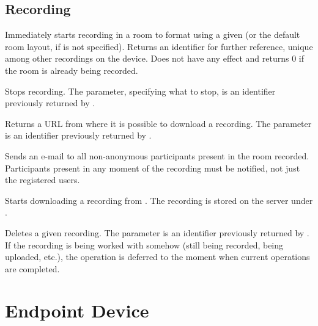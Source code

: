 \subsection{Recording}
\begin{Api}

Immediately starts recording in a room to format  using a given  (or the default room layout, if  is not specified). Returns an identifier for further reference, unique among other recordings on the device. Does not have any effect and returns 0 if the room is already being recorded.

Stops recording. The  parameter, specifying what to stop, is an identifier previously returned by .

Returns a URL from where it is possible to download a recording. The  parameter is an identifier previously returned by .

Sends an e-mail to all non-anonymous participants present in the room recorded. Participants present in any moment of the recording must be notified, not just the registered users.

Starts downloading a recording from . The recording is stored on the server under .

Deletes a given recording. The  parameter is an identifier previously returned by . If the recording is being worked with somehow (still being recorded, being uploaded, etc.), the operation is deferred to the moment when current operations are completed.

\end{Api}


\section{Endpoint Device} \label{sect:connector-endpoint-api}

